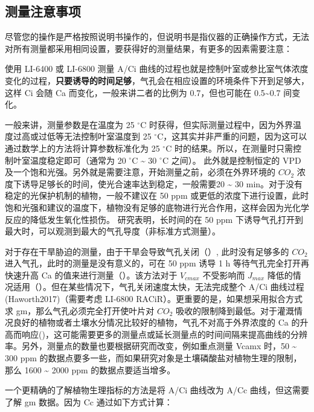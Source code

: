\documentclass[
]{krantz}
\begin{document}
\hypertarget{note_detail}{%
\subsection{测量注意事项}\label{note_detail}}

尽管您的操作是严格按照说明书操作的，但说明书是指仪器的正确操作方式，无法对所有测量都采用相同设置，要获得好的测量结果，有更多的因素需要注意：

使用 LI-6400 或 LI-6800 测量 A/Ci 曲线的过程也就是控制叶室或参比室气体浓度变化的过程，\textbf{只要诱导的时间足够}，气孔会在相应设置的环境条件下开到足够大，这样 Ci 会随 Ca 而变化，一般来讲二者的比例为 0.7，但也可能在 0.5\textasciitilde0.7 间变化。

一般来讲，测量参数是在温度为 25 \(^{\circ}\)C 时获得，但实际测量过程中，因为外界温度过高或过低等无法控制叶室温度到 25 \(^{\circ}\)C，这其实并非严重的问题，因为这可以通过数学上的方法将计算参数标准化为 25 \(^{\circ}\)C 时的结果。所以，在测量时只需控制叶室温度稳定即可（通常为 20 \(^{\circ}\)C \textasciitilde{} 30 \(^{\circ}\)C 之间）。 此外就是控制恒定的 VPD 及一个饱和光强。另外就是需要注意，开始测量之前，必须在外界环境的 \(CO_2\) 浓度下诱导足够长的时间，使光合速率达到稳定，一般需要20 \textasciitilde{} 30 min。对于没有稳定的光保护机制的植物，一般不建议在 50 ppm 或更低的浓度下进行设置，此时饱和光强和建议的温度下，植物没有足够的底物进行光合作用，这样会因为光化学反应的降低发生氧化性损伤。\citet{centritto2003} 研究表明，长时间的在 50 ppm 下诱导气孔打开到最大时，可以观测到最大的气孔导度（非标准方式测量）。

对于存在干旱胁迫的测量，由于干旱会导致气孔关闭（\citet{lauteri2014}）, 此时没有足够多的 \(CO_2\) 进入气孔，此时的测量是没有意义的，可在 50 ppm 诱导 1 h 等待气孔完全打开再快速升高 Ca 的值来进行测量（\citet{centritto2003}）。该方法对于 \(V_{cmax}\) 不受影响而 \(J_{max}\) 降低的情况适用（\citet{Aganchich2009}）。但在某些情况下，气孔关闭速度太快，无法完成整个 A/Ci 曲线过程 (Haworth2017)（需要考虑 LI-6800 RACiR）。更重要的是，如果想采用拟合方式求 gm，那么气孔必须完全打开使叶片对 \(CO_2\) 吸收的限制降到最低。对于灌溉情况良好的植物或者土壤水分情况比较好的植物，气孔不对高于外界浓度的 Ca 的升高而响应(\citet{haworth2015coordination})，这可能需要更多的测量点或延长测量点的时间间隔来提高曲线的分辨率。另外，测量点的数量也要根据研究而改变，例如重点测量 Vcamx 时，50 \textasciitilde{} 300 ppm 的数据点要多一些，而如果研究对象是土壤磷酸盐对植物生理的限制，那么 1600 \textasciitilde{} 2000 ppm 的数据点要适当增多。

一个更精确的了解植物生理指标的方法是将 A/Ci 曲线改为 A/Cc 曲线，但这需要了解 gm 数据。因为 Cc 通过如下方式计算：
\end{document}
